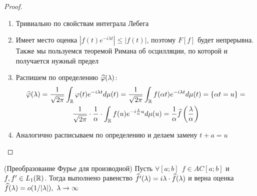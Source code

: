 \begin{proof}~
	\begin{enumerate}
		\item Тривиально по свойствам интеграла Лебега
		
		\item Имеет место оценка $|f(t)e^{-i\lambda t}| \le |f(t)|$, поэтому $F[f]$ будет непрерывна. Также мы пользуемся теоремой Римана об осцилляции, по которой и получается нужный предел
		
		\item Распишем по определению $\widehat{\varphi}(\lambda)$:
		\begin{multline*}
			\widehat{\varphi}(\lambda) = \frac{1}{\sqrt{2\pi}} \int_{\mathbb{R}} \varphi(t)e^{-i\lambda t}d\mu(t) = \frac{1}{\sqrt{2\pi}} \int_{\mathbb{R}} f(\alpha t) e^{-i\lambda t}d\mu(t) = \{\alpha t = u\} =
			\\
			\frac{1}{\sqrt{2\pi}} \cdot \frac{1}{\alpha} \cdot \int_{\mathbb{R}} f(u)e^{-i \frac{\lambda}{\alpha}u}d\mu(u) = \frac{1}{\alpha} \widehat{f}\left(\frac{\lambda}{\alpha}\right)
		\end{multline*}
		
		\item Аналогично расписываем по определению и делаем замену $t + a = u$
	\end{enumerate}
\end{proof}

\begin{theorem} (Преобразование Фурье для производной)
	Пусть $\forall [a; b]\ \ f \in AC[a; b]$ и $f, f' \in L_1(\mathbb{R})$. Тогда выполнено равенство $\widehat{f'}(\lambda) = i\lambda \cdot \widehat{f}(\lambda)$ и верна оценка $\widehat{f}(\lambda) = o(1 / |\lambda|),\ \lambda \to \infty$
\end{theorem}

